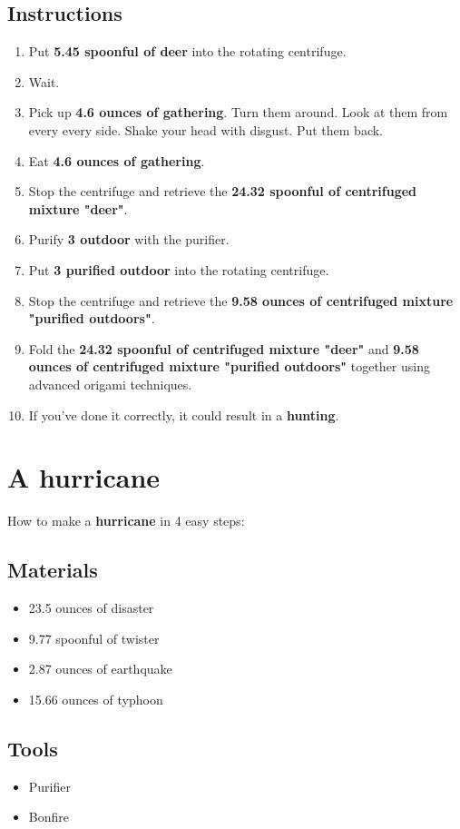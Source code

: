 \documentclass{article}
\begin{document}
\subsection{Instructions}\begin{enumerate}
\item 
Put \textbf{5.45 spoonful of deer} into the rotating centrifuge.
\item 
Wait.
\item 
Pick up \textbf{4.6 ounces of gathering}. Turn them around. Look at them from every every side. Shake your head with disgust. Put them back.
\item 
Eat \textbf{4.6 ounces of gathering}.
\item 
Stop the centrifuge and retrieve the \textbf{24.32 spoonful of centrifuged mixture "deer"}.
\item 
Purify \textbf{3 outdoor} with the purifier.
\item 
Put \textbf{3 purified outdoor} into the rotating centrifuge.
\item 
Stop the centrifuge and retrieve the \textbf{9.58 ounces of centrifuged mixture "purified outdoors"}.
\item 
Fold the \textbf{24.32 spoonful of centrifuged mixture "deer"} and \textbf{9.58 ounces of centrifuged mixture "purified outdoors"} together using advanced origami techniques.
\item 
If you've done it correctly, it could result in a \textbf{hunting}.
\end{enumerate}
\newpage
\section{A hurricane}How to make a \textbf{hurricane} in 4 easy steps:

\subsection{Materials}\begin{itemize}
\item 
23.5 ounces of disaster
\item 
9.77 spoonful of twister
\item 
2.87 ounces of earthquake
\item 
15.66 ounces of typhoon
\end{itemize}
\subsection{Tools}\begin{itemize}
\item 
Purifier
\item 
Bonfire
\end{itemize}
\end{document}
